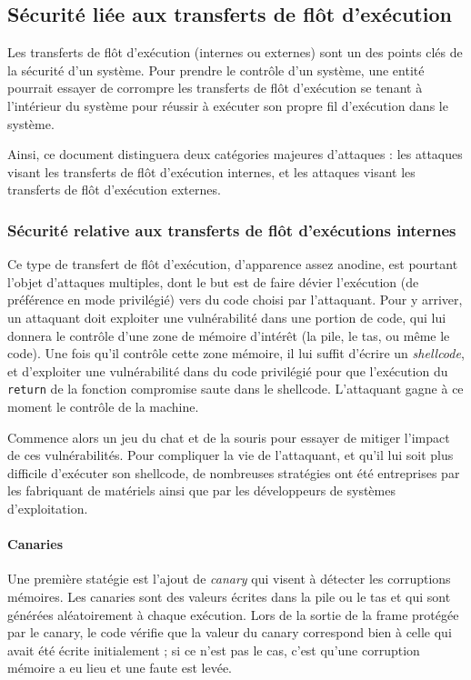 		\subsection{Sécurité liée aux transferts de flôt d'exécution}

		Les transferts de flôt d'exécution (internes ou externes) sont un des points clés de la sécurité d'un système. Pour prendre le contrôle d'un système, une entité pourrait essayer de corrompre les transferts de flôt d'exécution se tenant à l'intérieur du système pour réussir à exécuter son propre fil d'exécution dans le système.

		Ainsi, ce document distinguera deux catégories majeures d'attaques : les attaques visant les transferts de flôt d'exécution internes, et les attaques visant les transferts de flôt d'exécution externes.

		\subsubsection{Sécurité relative aux transferts de flôt d'exécutions internes}
Ce type de transfert de flôt d'exécution, d'apparence assez anodine, est pourtant l'objet d'attaques multiples, dont le but est de faire dévier l'exécution (de préférence en mode privilégié) vers du code choisi par l'attaquant. Pour y arriver, un attaquant doit exploiter une vulnérabilité dans une portion de code, qui lui donnera le contrôle d'une zone de mémoire d'intérêt (la pile, le tas, ou même le code). Une fois qu'il contrôle cette zone mémoire, il lui suffit d'écrire un \emph{shellcode}, et d'exploiter une vulnérabilité dans du code privilégié pour que l'exécution du \texttt{return} de la fonction compromise saute dans le shellcode. L'attaquant gagne à ce moment le contrôle de la machine.

Commence alors un jeu du chat et de la souris pour essayer de mitiger l'impact de ces vulnérabilités. Pour compliquer la vie de l'attaquant, et qu'il lui soit plus difficile d'exécuter son shellcode, de nombreuses stratégies ont été entreprises par les fabriquant de matériels ainsi que par les développeurs de systèmes d'exploitation. 

\paragraph{Canaries}
Une première statégie est l'ajout de \emph{canary} qui visent à détecter les corruptions mémoires. Les canaries sont des valeurs écrites dans la pile ou le tas et qui sont générées aléatoirement à chaque exécution. Lors de la sortie de la frame protégée par le canary, le code vérifie que la valeur du canary correspond bien à celle qui avait été écrite initialement ; si ce n'est pas le cas, c'est qu'une corruption mémoire a eu lieu et une faute est levée.

